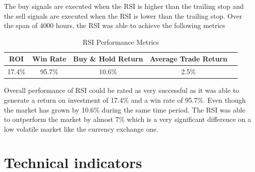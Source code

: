 \documentclass{imc-inf}
\begin{document}
				The buy signals are executed when the RSI is higher than the trailing stop
				and the sell signals are executed when the RSI is lower than the trailing stop. 
				Over the span of 4000 hours, the RSI was able to achieve the following metrics
				\begin{table}[h!]
					\centering
					\begin{tabular}{|c|c|c|c|c|}
						\hline
						\textbf{ROI} & \textbf{Win Rate} & \textbf{Buy \& Hold Return} & \textbf{Average Trade Return} \\ \hline
						17.4\%         & 95.7\%               & 10.6\%                         & 2.5\%                           \\ \hline
					\end{tabular}
					\caption{RSI Performance Metrics}
					\label{tab:rsi_performance_metrics}
				\end{table}

				Overall performance of RSI could be rated as very successful as it was able to generate a return on investment of 17.4\% and a win rate of 95.7\%.
				Even though the market has grown by 10.6\% during the same time period. The RSI was able to outperform the market by almost 7\% which is a very
				significant difference on a low volatile market like the currency exchange one.
		\section{Technical indicators}
\end{document}
